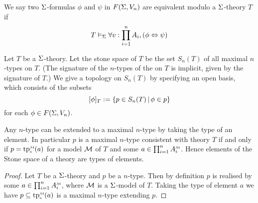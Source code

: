 \begin{dfn}
    We say two $\Sigma$-formulas $\phi$ and $\psi$ in $F(\Sigma,V_n)$ 
    are equivalent modulo a $\Sigma$-theory $T$ if 
    \[T \vDash_{\Sigma} \forall v : \prod_{i=1}^n A_i, \left(\phi \Leftrightarrow \psi\right)\]
\end{dfn}

\begin{dfn}
    Let $T$ be a $\Sigma$-theory.
    Let the stone space of $T$
    be the set $S_n(T)$ of all maximal $n$-types on $T$.
    (The signature of the $n$-types of the on $T$ is implicit, 
    given by the signature of $T$.)
    We give a topology on $S_n(T)$ by specifying an open basis,
    which consists of the subsets
    \[
        [\phi]_T := \left\{p \in S_n(T) \,|\, \phi \in p\right\}
    \]
    for each $\phi \in F(\Sigma,V_n)$.
\end{dfn}

\begin{lem}
    Any $n$-type can be extended to a maximal $n$-type
    by taking the type of an element.
    In particular $p$ is a maximal $n$-type consistent with theory $T$ 
    if and only if $p = \subintp{n}{\MM}{\tp}(a)$ for 
    a model $\mathcal{M}$ of $T$ and some $a \in \prod_{i=1}^n \mmintp{A_i}$.
    Hence elements of the Stone space of a theory are types of elements.
\end{lem}
\begin{proof}
    Let $T$ be a $\Sigma$-theory and $p$ be a $n$-type.
    Then by definition $p$ is realised by some 
    $a \in \prod_{i=1}^n \mmintp{A_i}$, 
    where $\mathcal{M}$ is a $\Sigma$-model of $T$.
    Taking the type of element $a$ we have 
    $p \subs \subintp{n}{\MM}{\tp}(a)$ is a maximal $n$-type extending $p$.
\end{proof}


